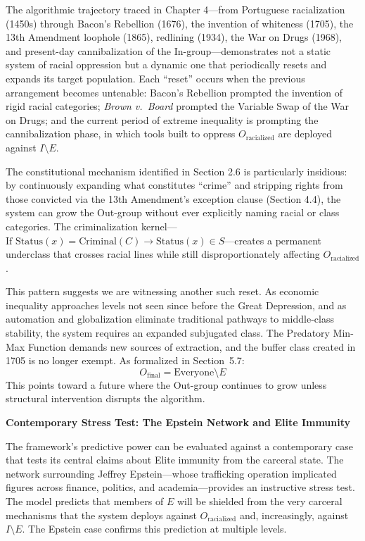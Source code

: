 \documentclass[12pt,openany]{book}
\begin{document}
The algorithmic trajectory traced in Chapter 4---from Portuguese racialization (1450s) through Bacon's Rebellion (1676), the invention of whiteness (1705), the 13th Amendment loophole (1865), redlining (1934), the War on Drugs (1968), and present-day cannibalization of the In-group---demonstrates not a static system of racial oppression but a dynamic one that periodically resets and expands its target population. Each ``reset'' occurs when the previous arrangement becomes untenable: Bacon's Rebellion prompted the invention of rigid racial categories; \textit{Brown v.\ Board} prompted the Variable Swap of the War on Drugs; and the current period of extreme inequality is prompting the cannibalization phase, in which tools built to oppress $O_{\text{racialized}}$ are deployed against $I \setminus E$.

The constitutional mechanism identified in Section 2.6 is particularly insidious: by continuously expanding what constitutes ``crime'' and stripping rights from those convicted via the 13th Amendment's exception clause (Section 4.4), the system can grow the Out-group without ever explicitly naming racial or class categories. The criminalization kernel---$\text{If } \text{Status}(x) = \text{Criminal}(C) \rightarrow \text{Status}(x) \in S$---creates a permanent underclass that crosses racial lines while still disproportionately affecting $O_{\text{racialized}}$.

This pattern suggests we are witnessing another such reset. As economic inequality approaches levels not seen since before the Great Depression, and as automation and globalization eliminate traditional pathways to middle-class stability, the system requires an expanded subjugated class. The Predatory Min-Max Function demands new sources of extraction, and the buffer class created in 1705 is no longer exempt. As formalized in Section~5.7:
\[
O_{\text{final}} = \text{Everyone} \setminus E
\]
This points toward a future where the Out-group continues to grow unless structural intervention disrupts the algorithm.

\textbf{Contemporary Stress Test: The Epstein Network and Elite Immunity}

The framework's predictive power can be evaluated against a contemporary case that tests its central claims about Elite immunity from the carceral state. The network surrounding Jeffrey Epstein---whose trafficking operation implicated figures across finance, politics, and academia---provides an instructive stress test. The model predicts that members of $E$ will be shielded from the very carceral mechanisms that the system deploys against $O_{\text{racialized}}$ and, increasingly, against $I \setminus E$. The Epstein case confirms this prediction at multiple levels.
\end{document}
